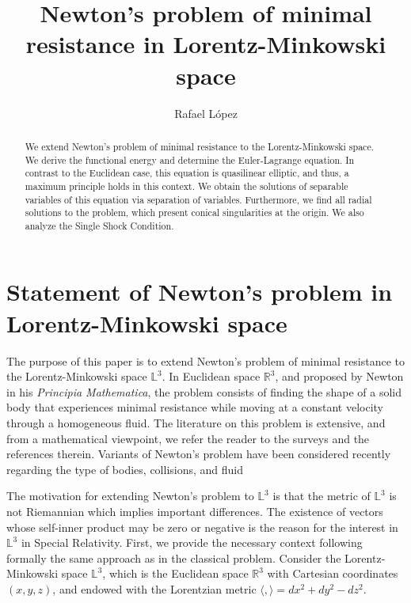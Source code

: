 \documentclass[a4paper,12pt]{amsart}
\theoremstyle{definition}
\def\r{\mathbb R}
\def\l{\mathbb L}
\begin{document}
\title{Newton's problem  of minimal resistance in Lorentz-Minkowski space }
\author{Rafael L\'opez}
\address{Department of Geometry and Topology\\ University of Granada. 18071 Granada, Spain}
 \keywords{}
\begin{abstract}
We extend Newton's problem of minimal resistance to the Lorentz-Minkowski space. We derive the functional energy and  determine the Euler-Lagrange equation. In contrast to the Euclidean case, this equation is quasilinear elliptic, and thus, a maximum principle holds in this context. We obtain  the solutions of separable variables of this equation via separation of variables. Furthermore, we find all radial solutions to the problem, which present conical singularities at the origin.  We also analyze the Single Shock Condition. 
  \end{abstract}

 

\maketitle
\section{Statement of   Newton's problem in Lorentz-Minkowski space}

The purpose of this paper is to extend   Newton's problem of minimal resistance   to the Lorentz-Minkowski space $\l^3$. In Euclidean space $\r^3$, and proposed by Newton in  his {\it Principia Mathematica}, the problem consists of finding the shape of a solid body that experiences  minimal resistance while moving at a constant  velocity through a homogeneous fluid. The literature on this problem is extensive, and from a mathematical viewpoint, we refer the reader to the surveys   \cite{bu,bk} and the references therein. Variants of Newton's problem have been considered recently regarding the type of bodies, collisions, and fluid \cite{bfk,bk,cl,hk,lo2,pt,pt2}


The motivation for   extending   Newton's problem to $\l^3$ is that the metric of $\l^3$ is not Riemannian which implies important differences. The existence of vectors whose self-inner product may be   zero or negative is the reason for the interest in $\l^3$ in Special Relativity. 
 First, we provide the necessary  context following formally the same approach as in the classical problem. Consider the Lorentz-Minkowski space $\l^3$, which is the Euclidean space $\r^3$ with Cartesian coordinates $(x,y,z)$, and  endowed with the Lorentzian metric $\langle,\rangle=dx^2+dy^2-dz^2$.  
\end{document}
